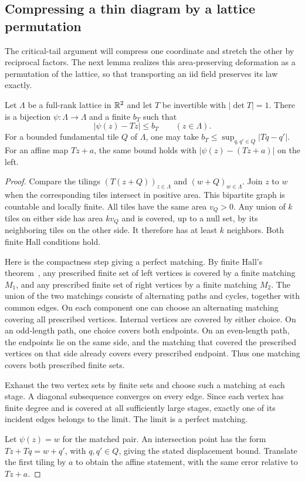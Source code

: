 \subsection{Compressing a thin diagram by a lattice permutation}

The critical-tail argument will compress one coordinate and stretch
the other by reciprocal factors.  The next lemma realizes this
area-preserving deformation as a permutation of the lattice, so
that transporting an iid field preserves its law exactly.

\begin{lemma}
\label{probability:matching}
Let $\Lambda$ be a full-rank lattice in $\mathbb R^2$ and let $T$ be
invertible with $|\det T|=1$.  There is a bijection
$\psi:\Lambda\to\Lambda$ and a finite $b_T$ such that
\[
                  |\psi(z)-Tz|\le b_T\qquad(z\in\Lambda).
\]
For a bounded fundamental tile $Q$ of $\Lambda$, one may take
$b_T\le\sup_{q,q'\in Q}|Tq-q'|$.  For an affine map $Tz+a$,
the same bound holds with $|\psi(z)-(Tz+a)|$ on the left.
\end{lemma}

\begin{proof}
Compare the tilings $(T(z+Q))_{z\in\Lambda}$ and
$(w+Q)_{w\in\Lambda}$.  Join $z$ to $w$ when the corresponding
tiles intersect in positive area.  This bipartite graph is countable
and locally finite.  All tiles have the same area $v_Q>0$.  Any union
of $k$ tiles on either side has area $kv_Q$ and is covered, up to a
null set, by its neighboring tiles on the other side.  It therefore
has at least $k$ neighbors.  Both finite Hall conditions hold.

Here is the compactness step giving a perfect matching.  By finite
Hall's theorem~\cite[Theorem~1]{Hall1935}, any prescribed finite
set of left vertices is covered by a finite matching $M_1$, and
any prescribed finite set of right vertices by a finite matching
$M_2$.  The union of the two matchings consists of alternating
paths and cycles, together with common edges.  On each component
one can choose an alternating matching covering all prescribed
vertices.  Internal vertices are covered by either choice.  On an
odd-length path, one choice covers both endpoints.  On an
even-length path, the endpoints lie on the same side, and the
matching that covered the prescribed vertices on that side already
covers every prescribed endpoint.  Thus one matching covers both
prescribed finite sets.

Exhaust the two vertex sets by finite sets and choose such a
matching at each stage.  A diagonal subsequence converges on every
edge.  Since each vertex has finite degree and is covered at all
sufficiently large stages, exactly one of its incident edges belongs
to the limit.  The limit is a perfect matching.

Let $\psi(z)=w$ for the matched pair.  An intersection point has
the form $Tz+Tq=w+q'$, with $q,q'\in Q$, giving the stated
displacement bound.  Translate the first tiling by $a$ to obtain
the affine statement, with the same error relative to $Tz+a$.
\end{proof}

